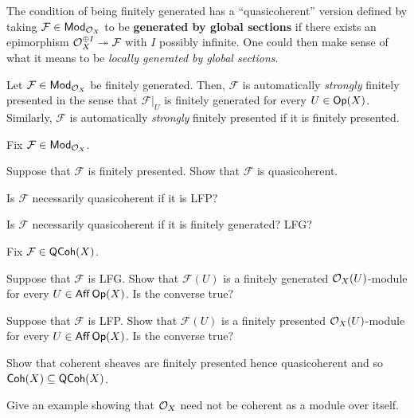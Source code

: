\documentclass[11pt]{article}
\renewcommand{\F}{\mathcal{F}}
\begin{document}
\begin{remark}
The condition of being finitely generated has a ``quasicoherent'' version defined by taking $\F\in\Mod_{\O_X}$ to be \textbf{generated by global sections} if there exists an epimorphism $\O_X^{\oplus I}\surj\F$ with $I$ possibly infinite. One could then make sense of what it means to be \emph{locally generated by global sections}.
\end{remark}

\begin{remark}
Let $\F\in\Mod_{\O_X}$ be finitely generated. Then, $\F$ is automatically \emph{strongly} finitely presented in the sense that $\F|_U$ is finitely generated for every $U\in\operatorname{\mathsf{Op}}(X)$. Similarly, $\F$ is automatically \emph{strongly} finitely presented if it is finitely presented.
\end{remark}

\begin{exercise}
Fix $\F\in\Mod_{\O_X}$.
\begin{enum}{\alph}
\item Suppose that $\F$ is finitely presented. Show that $\F$ is quasicoherent.

\item Is $\F$ necessarily quasicoherent if it is LFP?

\item Is $\F$ necessarily quasicoherent if it is finitely generated? LFG?
\end{enum}
\end{exercise}

\begin{exercise}
Fix $\F\in\QCoh(X)$. 
\begin{enum}{\alph}
\item Suppose that $\F$ is LFG. Show that $\F(U)$ is a finitely generated $\mathcal{O}_X(U)$-module for every $U\in\operatorname{\mathsf{Aff}}\operatorname{\mathsf{Op}}(X)$. Is the converse true? 

\item Suppose that $\F$ is LFP. Show that $\F(U)$ is a finitely presented $\mathcal{O}_X(U)$-module for every $U\in\operatorname{\mathsf{Aff}}\operatorname{\mathsf{Op}}(X)$. Is the converse true? 
\end{enum}
\end{exercise}

\begin{exercise}
Show that coherent sheaves are finitely presented hence quasicoherent and so $\operatorname{\mathsf{Coh}}(X)\subseteq\operatorname{\mathsf{QCoh}}(X)$.
\end{exercise}

\begin{exercise}
Give an example showing that $\mathcal{O}_X$ need not be coherent as a module over itself.
\end{exercise}
\end{document}
